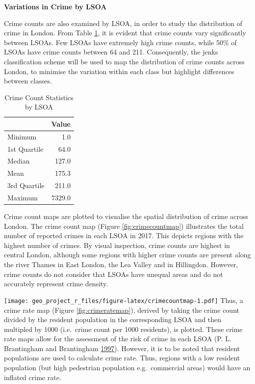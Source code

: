 \documentclass[]{article}
\theoremstyle{definition}
\theoremstyle{definition}
\theoremstyle{definition}
\theoremstyle{remark}
\begin{document}
\textbf{Variations in Crime by LSOA}

Crime counts are also examined by LSOA, in order to study the
distribution of crime in London. From Table \ref{tab:LSOAstats}, it is
evident that crime counts vary significantly between LSOAs. Few LSOAs
have extremely high crime counts, while 50\% of LSOAs have crime counts
between 64 and 211. Consequently, the jenks classification scheme will
be used to map the distribution of crime counts across London, to
minimise the variation within each class but highlight differences
between classes.

\begin{table}

\caption{\label{tab:LSOAstats}Crime Count Statistics by LSOA}
\centering
\begin{tabular}[t]{l|r}
\hline
  & Value\\
\hline
Minimum & 1.0\\
\hline
1st Quartile & 64.0\\
\hline
Median & 127.0\\
\hline
Mean & 175.3\\
\hline
3rd Quartile & 211.0\\
\hline
Maximum & 7329.0\\
\hline
\end{tabular}
\end{table}

Crime count maps are plotted to visualise the spatial distribution of
crime across London. The crime count map (Figure
\ref{fig:crimecountmap}) illustrates the total number of reported crimes
in each LSOA in 2017. This depicts regions with the highest number of
crimes. By visual inspection, crime counts are highest in central
London, although some regions with higher crime counts are present along
the river Thames in East London, the Lea Valley and in Hillingdon.
However, crime counts do not consider that LSOAs have unequal areas and
do not accurately represent crime density.

\texttt{[image: geo\_project\_r\_files/figure-latex/crimecountmap-1.pdf]}
Thus, a crime rate map (Figure \ref{fig:crimeratemap}), derived by
taking the crime count divided by the resident population in the
corresponding LSOA and then multipled by 1000 (i.e.~crime count per 1000
residents), is plotted. These crime rate maps allow for the assessment
of the risk of crime in each LSOA (P. L. Brantingham and Brantingham
\protect\hyperlink{ref-Brantingham1997}{1997}). However, it is to be
noted that resident populations are used to calculate crime rate. Thus,
regions with a low resident population (but high pedestrian population
e.g.~commercial areas) would have an inflated crime rate.
\end{document}
